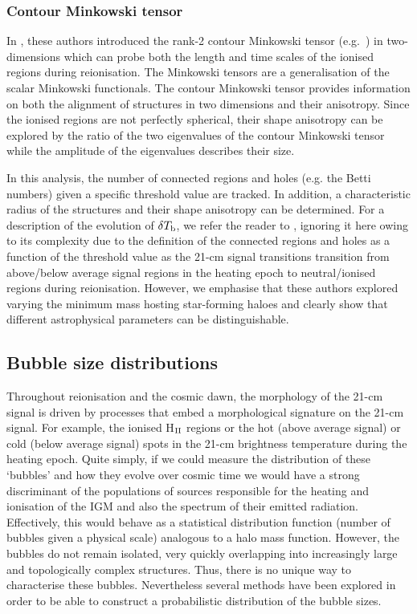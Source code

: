 \subsubsection{Contour Minkowski tensor}

In \cite{Kapahtia:2018,Kapahtia:2019}, these authors introduced the rank-2 contour Minkowski tensor (e.g.~\cite{mcmullen1997,alesker1999,beisbart2002,hug2008,schroder2010,Schroder-Turk:2013}) in two-dimensions which can probe both the length and time scales of the ionised regions during reionisation. The Minkowski tensors are a generalisation of the scalar Minkowski functionals. The contour Minkowski tensor provides information on both the alignment of structures in two dimensions and their anisotropy. Since the ionised regions are not perfectly spherical, their shape anisotropy can be explored by the ratio of the two eigenvalues of the contour Minkowski tensor while the amplitude of the eigenvalues describes their size.

In this analysis, the number of connected regions and holes (e.g. the Betti numbers) given a specific threshold value are tracked. In addition, a characteristic radius of the structures and their shape anisotropy can be determined. For a description of the evolution of $\delta T_{\rm b}$, we refer the reader to \cite{Kapahtia:2019}, ignoring it here owing to its complexity due to the definition of the connected regions and holes as a function of the threshold value as the 21-cm signal transitions transition from above/below average signal regions in the heating epoch to neutral/ionised regions during reionisation. However, we emphasise that these authors explored varying the minimum mass hosting star-forming haloes and clearly show that different astrophysical parameters can be distinguishable.

\subsection{Bubble size distributions} \label{sec:BSDs}

Throughout reionisation and the cosmic dawn, the morphology of the 21-cm signal is driven by processes that embed a morphological signature on the 21-cm signal. For example, the ionised H$_{\rm \scriptsize II}$ regions or the hot (above average signal) or cold (below average signal) spots in the 21-cm brightness temperature during the heating epoch. Quite simply, if we could measure the distribution of these `bubbles' and how they evolve over cosmic time we would have a strong discriminant of the populations of sources responsible for the heating and ionisation of the IGM and also the spectrum of their emitted radiation. Effectively, this would behave as a statistical distribution function (number of bubbles given a physical scale) analogous to a halo mass function. However, the bubbles do not remain isolated, very quickly overlapping into increasingly large and topologically complex structures. Thus, there is no unique way to characterise these bubbles. Nevertheless several methods have been explored in order to be able to construct a probabilistic distribution of the bubble sizes.

